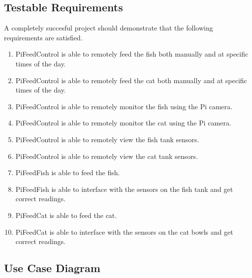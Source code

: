 \subsection{Testable Requirements}
A completely succesful project should demonstrate that the following requirements
are satisfied.
\begin{enumerate}
    \item PiFeedControl is able to remotely feed the fish both manually and at
          specific times of the day.
    \item PiFeedControl is able to remotely feed the cat both manually and at
          specific times of the day.
    \item PiFeedControl is able to remotely monitor the fish using the Pi camera.
    \item PiFeedControl is able to remotely monitor the cat using the Pi camera.
    \item PiFeedControl is able to remotely view the fish tank sensors.
    \item PiFeedControl is able to remotely view the cat tank sensors.
    \item PiFeedFish is able to feed the fish.
    \item PiFeedFish is able to interface with the sensors on the fish tank and
          get correct readings.
    \item PiFeedCat is able to feed the cat.
    \item PiFeedCat is able to interface with the sensors on the cat bowls and
          get correct readings.
\end{enumerate}

\subsection{Use Case Diagram}


